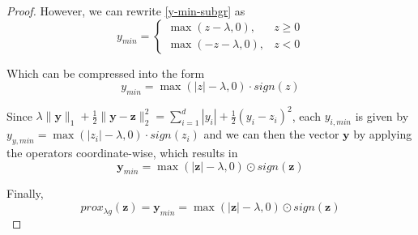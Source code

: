 \documentclass[12pt]{article}
\begin{document}
\begin{proof}
However, we can rewrite \eqref{y-min-subgr} as
\begin{equation} \label{y-min-penultimate}
     y_{min} = \begin{cases}
     \max (z - \lambda, 0),   & z \geq 0 \\
     \max (-z - \lambda, 0),   & z < 0
     \end{cases}
\end{equation}

Which can be compressed into the form
\begin{equation}
    y_{min} = \max(|z| - \lambda, 0) \cdot sign(z)
\end{equation}

Since $\lambda \lVert \mathbf{y} \rVert_1 + \frac{1}{2} \lVert \mathbf{y} - \mathbf{z} \rVert_2^2 = \sum_{i=1}^{d}|y_i| + \frac{1}{2}(y_i - z_i)^2$, each $y_{i, min}$ is given by $y_{y, min} = \max(|z_i| - \lambda, 0) \cdot sign(z_i)$ and we can then the vector $\mathbf{y}$ by applying the operators coordinate-wise, which results in
\begin{equation}
    \mathbf{y}_{min} = \max(|\mathbf{z}| - \lambda, 0) \odot sign(\mathbf{z})
\end{equation}

Finally,
\begin{equation}
    prox_{\lambda g}(\mathbf{z}) = \mathbf{y}_{min} = \max(|\mathbf{z}| - \lambda, 0) \odot sign(\mathbf{z})
\end{equation}

\end{proof}
\end{document}
